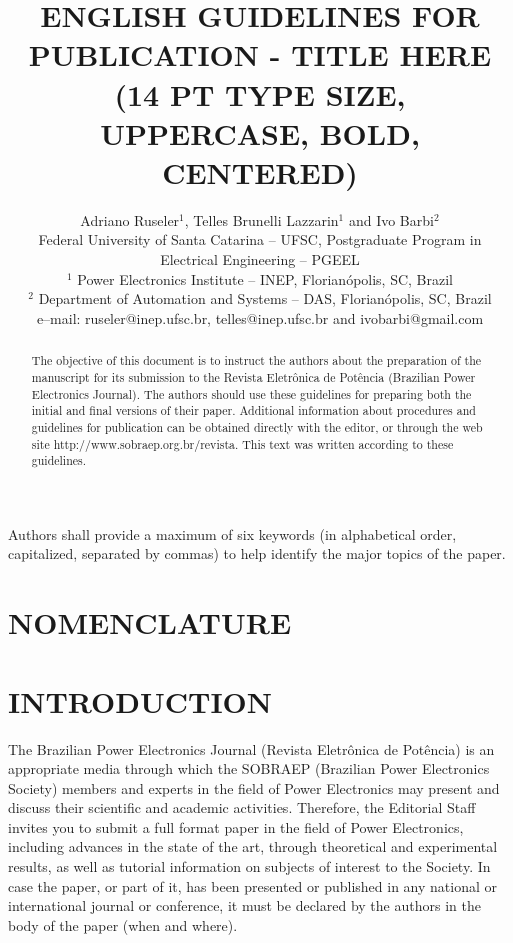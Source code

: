 \documentclass[english]{cobep-spec}
\title{ENGLISH GUIDELINES FOR PUBLICATION - TITLE HERE \\(14 PT TYPE SIZE, UPPERCASE, BOLD, CENTERED)}
\author{Adriano Ruseler$^{1}$, Telles Brunelli Lazzarin$^{1}$ and Ivo Barbi$^{2}$\\
	\normalsize Federal University of Santa Catarina -- UFSC, Postgraduate Program in Electrical Engineering -- PGEEL \\
	\normalsize $^{1}$ Power Electronics Institute -- INEP, Florianópolis, SC, Brazil\\
	\normalsize $^{2}$ Department of Automation and Systems -- DAS, Florianópolis, SC, Brazil\\
	\normalsize e--mail: ruseler@inep.ufsc.br, telles@inep.ufsc.br and ivobarbi@gmail.com
}
\begin{document}
\maketitle

\begin{abstract}
	The objective of this document is to instruct the authors about the preparation of the manuscript for its submission to the Revista Eletrônica de Potência (Brazilian Power Electronics Journal). The authors should use these guidelines for preparing both the initial and final versions of their paper. Additional information about procedures and guidelines for publication can be obtained directly with the editor, or through the web site http://www.sobraep.org.br/revista. This text was written according to these guidelines.
\end{abstract}

\begin{keywords}
	Authors shall provide a maximum of six keywords (in alphabetical order, capitalized, separated by commas) to help identify the major topics of the paper.
\end{keywords}


\section*{NOMENCLATURE}




\section{INTRODUCTION}

The Brazilian Power Electronics Journal (Revista Eletrônica de Potência) is an appropriate media through which the SOBRAEP (Brazilian Power Electronics Society) members and experts in the field of Power Electronics may present and discuss their scientific and academic activities. Therefore, the Editorial Staff invites you to submit a full format paper in the field of Power Electronics, including advances in the state of the art, through theoretical and experimental results, as well as tutorial information on subjects of interest to the Society. In case the paper, or part of it, has been presented or published in any national or international journal or conference, it must be declared by the authors in the body of the paper (when and where). 
\end{document}
